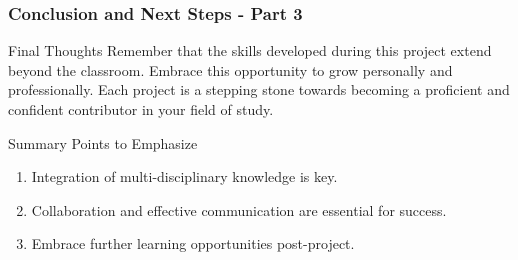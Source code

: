 \documentclass[aspectratio=169]{beamer}
\begin{document}
\begin{frame}[fragile]
  \frametitle{Conclusion and Next Steps - Part 3}

  \begin{block}{Final Thoughts}
    Remember that the skills developed during this project extend beyond the classroom. Embrace this opportunity to grow personally and professionally. Each project is a stepping stone towards becoming a proficient and confident contributor in your field of study.
  \end{block}
  
  \begin{block}{Summary Points to Emphasize}
    \begin{enumerate}
      \item Integration of multi-disciplinary knowledge is key.
      \item Collaboration and effective communication are essential for success.
      \item Embrace further learning opportunities post-project.
    \end{enumerate}
  \end{block}
\end{frame}
\end{document}
